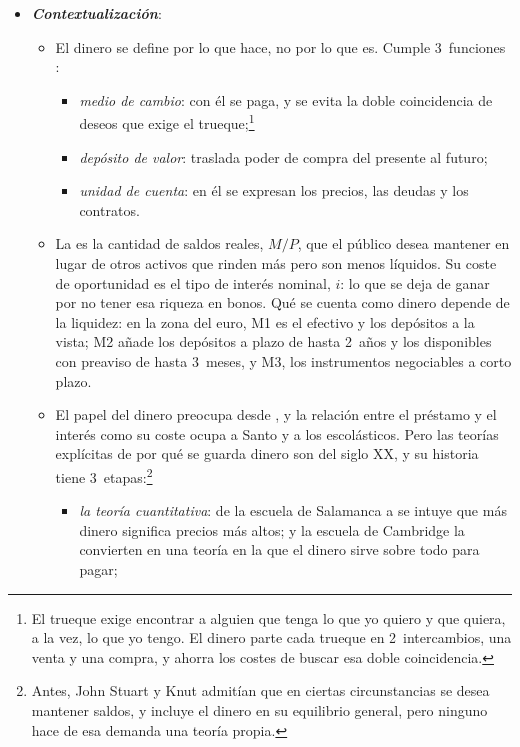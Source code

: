 \documentclass[11pt]{article}
\begin{document}
\begin{itemize}
\item \textbf{\emph{Contextualización}}:
  \begin{itemize}
  \item El dinero se define por lo que hace, no por lo que es\nocite{Hicks1967Critical}. Cumple 3~funciones :
    \begin{itemize}
    \item \emph{medio de cambio}: con él se paga, y se evita la doble coincidencia de deseos que exige el trueque;\footnote{El trueque exige encontrar a alguien que tenga lo que yo quiero y que quiera, a la vez, lo que yo tengo. El dinero parte cada trueque en 2~intercambios, una venta y una compra, y ahorra los costes de buscar esa doble coincidencia.}
    \item \emph{depósito de valor}: traslada poder de compra del presente al futuro;
    \item \emph{unidad de cuenta}: en él se expresan los precios, las deudas y los contratos.
    \end{itemize}
  \item La  es la cantidad de saldos reales, $M/P$, que el público desea mantener en lugar de otros activos que rinden más pero son menos líquidos. Su coste de oportunidad es el tipo de interés nominal, $i$: lo que se deja de ganar por no tener esa riqueza en bonos. Qué se cuenta como dinero depende de la liquidez: en la zona del euro, M1 es el efectivo y los depósitos a la vista; M2 añade los depósitos a plazo de hasta 2~años y los disponibles con preaviso de hasta 3~meses, y M3, los instrumentos negociables a corto plazo\nocite{BCE2026AgregadosDef}.
  \item El papel del dinero preocupa desde , y la relación entre el préstamo y el interés como su coste ocupa a Santo  y a los escolásticos. Pero las teorías explícitas de por qué se guarda dinero son del siglo XX, y su historia tiene 3~etapas:\footnote{Antes, John Stuart \textcite{Mill1848Principles} y Knut \textcite{Wicksell1898Geldzins} admitían que en ciertas circunstancias se desea mantener saldos, y  incluye el dinero en su equilibrio general\nocite{Walras1874Elements}, pero ninguno hace de esa demanda una teoría propia.}
    \begin{itemize}
    \item \emph{la teoría cuantitativa}: de la escuela de Salamanca a  se intuye que más dinero significa precios más altos; \textcite{Fisher1911Purchasing} y la escuela de Cambridge\nocite{Pigou1917Value} la convierten en una teoría en la que el dinero sirve sobre todo para pagar;

\end{itemize}
\end{itemize}
\end{itemize}
\end{document}
